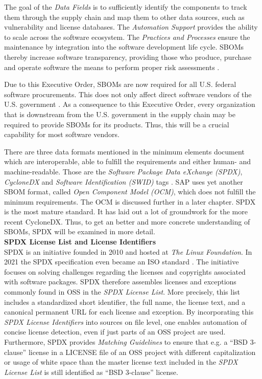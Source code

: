 The goal of the \textit{Data Fields} is to sufficiently identify the components to track them through the supply chain and map them to other data sources, such as vulnerability and license databases. The \textit{Automation Support} provides the ability to scale across the software ecosystem. The \textit{Practices and Processes} ensure the maintenance by integration into the software development life cycle. SBOMs thereby increase software transparency, providing those who produce, purchase and operate software the means to perform proper risk assessments \cite{NTIASBOM}.\par
Due to this Executive Order, SBOMs are now required for all U.S. federal software procurements. This does not only affect direct software vendors of the U.S. government \cite{ExecutiveOrderSBOM}. As a consequence to this Executive Order, every organization that is downstream from the U.S. government in the supply chain may be required to provide SBOMs for its products. Thus, this will be a crucial capability for most software vendors.\par
There are three data formats mentioned in the minimum elements document which are interoperable, able to fulfill the requirements and either human- and machine-readable. Those are the \textit{Software Package Data eXchange (SPDX)}, \textit{CycloneDX} and \textit{Software Identification (SWID)} tags \cite{NTIASBOM}. SAP uses yet another SBOM format, called \emph{Open Component Model (OCM)}, which does not fulfill the minimum requirements. The OCM is discussed further in a later chapter. SPDX is the most mature standard. It has laid out a lot of groundwork for the more recent CycloneDX. Thus, to get an better and more concrete understanding of SBOMs, SPDX will be examined in more detail.\\

\noindent   
\textbf{SPDX License List and License Identifiers}\\
SPDX is an initiative founded in 2010 and hosted at \textit{The Linux Foundation}. In 2021 the SPDX specification even became an ISO standard \cite{SPDXISO}. The initiative focuses on solving challenges regarding the licenses and copyrights associated with software packages. SPDX therefore assembles licenses and exceptions commonly found in OSS in the \textit{SPDX License List}. More precisely, this list includes a standardized short identifier, the full name, the license text, and a canonical permanent URL for each license and exception. By incorporating this \textit{SPDX License Identifiers} into sources on file level, one enables automation of concise license detection, even if just parts of an OSS project are used. Furthermore, SPDX provides \textit{Matching Guidelines} to ensure that e.g. a \enquote{BSD 3-clause} license in a LICENSE file of an OSS project with different capitalization or usage of white space than the master license text included in the \textit{SPDX License List} is still identified as \enquote{BSD 3-clause} license.\\

